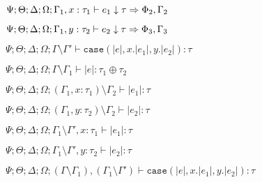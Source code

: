 {{{    $\Psi ; \Theta ; \Delta ; \Omega ; \Gamma_1, x: \tau_1 \vdash e_1 \downarrow \tau \Rightarrow \Phi_2,\Gamma_2$
   
    $\Psi ; \Theta ; \Delta ; \Omega ; \Gamma_1, y: \tau_2 \vdash e_2 \downarrow \tau \Rightarrow \Phi_3,\Gamma_3$
  }{
   $\Psi ; \Theta ; \Delta ; \Omega ; \Gamma \setminus \Gamma' \vdash \texttt{case}(|e|,x.|e_1|,y.|e_2|) : \tau$
  }
  
  
   $\Psi ; \Theta ; \Delta ; \Omega ; \Gamma \setminus \Gamma_1 \vdash |e| : \tau_1 \oplus \tau_2$
  
  
   $\Psi ; \Theta ; \Delta ; \Omega ; (\Gamma_1, x: \tau_1) \setminus \Gamma_2 \vdash |e_1| : \tau$
  
  
   $\Psi ; \Theta ; \Delta ; \Omega ; (\Gamma_1, y: \tau_2) \setminus \Gamma_2 \vdash |e_2| : \tau$
  
  
   $\Psi ; \Theta ; \Delta ; \Omega ; \Gamma_1 \setminus \Gamma', x : \tau_1 \vdash |e_1| : \tau$
  
   $\Psi ; \Theta ; \Delta ; \Omega ; \Gamma_1 \setminus \Gamma', y : \tau_2 \vdash |e_2| : \tau$
  
  
   $\Psi ; \Theta ; \Delta ; \Omega ; (\Gamma \setminus \Gamma_1), (\Gamma_1 \setminus \Gamma') \vdash \texttt{case}(|e|,x.|e_1|,y.|e_2|) : \tau$
  
 }
 
 
}
